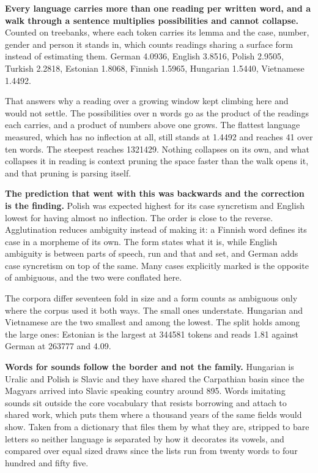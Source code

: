\textbf{Every language carries more than one reading per written word, and a walk through a sentence multiplies possibilities and cannot collapse.} Counted on treebanks, where each token carries its lemma and the case, number, gender and person it stands in, which counts readings sharing a surface form instead of estimating them. German 4.0936, English 3.8516, Polish 2.9505, Turkish 2.2818, Estonian 1.8068, Finnish 1.5965, Hungarian 1.5440, Vietnamese 1.4492.

That answers why a reading over a growing window kept climbing here and would not settle. The possibilities over n words go as the product of the readings each carries, and a product of numbers above one grows. The flattest language measured, which has no inflection at all, still stands at 1.4492 and reaches 41 over ten words. The steepest reaches 1321429. Nothing collapses on its own, and what collapses it in reading is context pruning the space faster than the walk opens it, and that pruning is parsing itself.

\textbf{The prediction that went with this was backwards and the correction is the finding.} Polish was expected highest for its case syncretism and English lowest for having almost no inflection. The order is close to the reverse. Agglutination reduces ambiguity instead of making it: a Finnish word defines its case in a morpheme of its own. The form states what it is, while English ambiguity is between parts of speech, run and that and set, and German adds case syncretism on top of the same. Many cases explicitly marked is the opposite of ambiguous, and the two were conflated here.

The corpora differ seventeen fold in size and a form counts as ambiguous only where the corpus used it both ways. The small ones understate. Hungarian and Vietnamese are the two smallest and among the lowest. The split holds among the large ones: Estonian is the largest at 344581 tokens and reads 1.81 against German at 263777 and 4.09.

\textbf{Words for sounds follow the border and not the family.} Hungarian is Uralic and Polish is Slavic and they have shared the Carpathian basin since the Magyars arrived into Slavic speaking country around 895. Words imitating sounds sit outside the core vocabulary that resists borrowing and attach to shared work, which puts them where a thousand years of the same fields would show. Taken from a dictionary that files them by what they are, stripped to bare letters so neither language is separated by how it decorates its vowels, and compared over equal sized draws since the lists run from twenty words to four hundred and fifty five.

